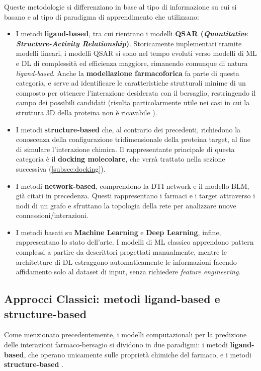 Queste metodologie si differenziano in base al tipo di informazione su
cui si basano e al tipo di paradigma di apprendimento che utilizzano:
\begin{itemize}
    \item I metodi \textbf{ligand-based}, tra cui rientrano i modelli
    \textbf{QSAR (\textit{Quantitative Structure-Activity Relationship})}. Storicamente implementati tramite modelli lineari, i modelli QSAR si
    sono nel tempo evoluti verso modelli di ML e DL di complessità ed
    efficienza maggiore, rimanendo comunque di natura \textit{ligand-based}.
    Anche la \textbf{modellazione farmacoforica} fa parte di questa
    categoria, e serve ad identificare le caratteristiche strutturali
    minime di un composto per ottenere l'interazione desiderata con il
    bersaglio, restringendo il campo dei possibili candidati (risulta
    particolarmente utile nei casi in cui la struttura 3D della proteina
    non è ricavabile \cite{mondalAIdrivenDrugTarget2026a}).
    \item I metodi \textbf{structure-based} che, al contrario dei
    precedenti, richiedono la conoscenza della configurazione tridimensionale della proteina
    target, al fine di simulare l'interazione chimica. Il rappresentante
    principale di questa categoria è il \textbf{docking molecolare},
    che verrà trattato nella sezione successiva (\cref{subsec:docking}).
    \item I metodi \textbf{network-based}, comprendono la DTI network e
    il modello BLM, già citati in precedenza. Questi rappresentano i
    farmaci e i target attraverso i nodi di un grafo e sfruttano la
    topologia della rete per analizzare nuove connessioni/interazioni.
    \item I metodi basati su \textbf{Machine Learning} e \textbf{Deep
    Learning}, infine, rappresentano lo stato dell'arte.
    I modelli di ML classico apprendono pattern complessi a partire da
    descrittori progettati manualmente, mentre le architetture di DL
    estraggono automaticamente le informazioni facendo affidamento solo
    al dataset di input, senza richiedere \textit{feature engineering}.
\end{itemize}
\subsection{Approcci Classici: metodi ligand-based e structure-based}
Come menzionato precedentemente, i modelli computazionali per la predizione delle interazioni farmaco-bersagio si dividono in due paradigmi: 
i metodi \textbf{ligand-based}, che operano unicamente sulle proprietà chimiche del farmaco, e i metodi \textbf{structure-based} \cite{ahmadMachineLearningDrugtarget2026}.

